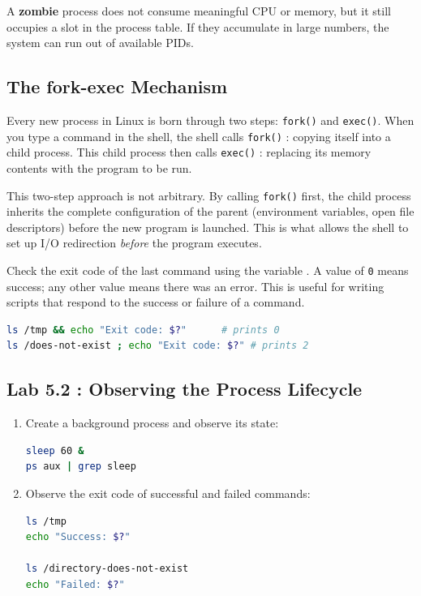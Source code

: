 \begin{notebox}
  A \textbf{zombie} process does not consume meaningful CPU or memory, but it
  still occupies a slot in the process table. If they accumulate in large
  numbers, the system can run out of available PIDs.
\end{notebox}

\subsection{The fork-exec Mechanism}

Every new process in Linux is born through two steps: \texttt{fork()} and
\texttt{exec()}. When you type a command in the shell, the shell calls
\texttt{fork()} : copying itself into a child process. This child process then
calls \texttt{exec()} : replacing its memory contents with the program to be
run.

This two-step approach is not arbitrary. By calling \texttt{fork()} first, the
child process inherits the complete configuration of the parent (environment
variables, open file descriptors) before the new program is launched. This is
what allows the shell to set up I/O redirection \textit{before} the program
executes.

\begin{tipbox}
  Check the exit code of the last command using the variable . A
  value of \texttt{0} means success; any other value means there was an error.
  This is useful for writing scripts that respond to the success or failure of
  a command.
\begin{lstlisting}[language=bash]
ls /tmp && echo "Exit code: $?"      # prints 0
ls /does-not-exist ; echo "Exit code: $?" # prints 2
\end{lstlisting}
\end{tipbox}

\subsection*{Lab 5.2 : Observing the Process Lifecycle}

\begin{enumerate}
  \item Create a background process and observe its state:
\begin{lstlisting}[language=bash, caption={Observing process state}]
sleep 60 &
ps aux | grep sleep
\end{lstlisting}

  \item Observe the exit code of successful and failed commands:
\begin{lstlisting}[language=bash, caption={Observing exit codes}]
ls /tmp
echo "Success: $?"

ls /directory-does-not-exist
echo "Failed: $?"
\end{lstlisting}
\end{enumerate}

